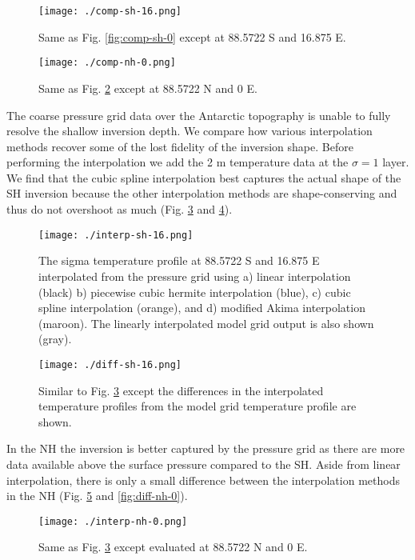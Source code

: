 \documentclass[11pt]{article}
\begin{document}
\begin{figure}[htbp]
\centering
\texttt{[image: ./comp-sh-16.png]}
\caption{\label{fig:comp-sh-16}Same as Fig. \ref{fig:comp-sh-0} except at 88.5722 S and 16.875 E.}
\end{figure}

\begin{figure}[htbp]
\centering
\texttt{[image: ./comp-nh-0.png]}
\caption{\label{fig:comp-nh-0}Same as Fig. \ref{fig:comp-nh-0} except at 88.5722 N and 0 E.}
\end{figure}

The coarse pressure grid data over the Antarctic topography is unable to fully resolve the shallow inversion depth. We compare how various interpolation methods recover some of the lost fidelity of the inversion shape. Before performing the interpolation we add the 2 m temperature data at the \(\sigma=1\) layer. We find that the cubic spline interpolation best captures the actual shape of the SH inversion because the other interpolation methods are shape-conserving and thus do not overshoot as much (Fig. \ref{fig:interp-sh-16} and \ref{fig:diff-sh-16}).

\begin{figure}[htbp]
\centering
\texttt{[image: ./interp-sh-16.png]}
\caption{\label{fig:interp-sh-16}The sigma temperature profile at 88.5722 S and 16.875 E interpolated from the pressure grid using a) linear interpolation (black) b) piecewise cubic hermite interpolation (blue), c) cubic spline interpolation (orange), and d) modified Akima interpolation (maroon). The linearly interpolated model grid output is also shown (gray).}
\end{figure}

\begin{figure}[htbp]
\centering
\texttt{[image: ./diff-sh-16.png]}
\caption{\label{fig:diff-sh-16}Similar to Fig. \ref{fig:interp-sh-16} except the differences in the interpolated temperature profiles from the model grid temperature profile are shown.}
\end{figure}

In the NH the inversion is better captured by the pressure grid as there are more data available above the surface pressure compared to the SH. Aside from linear interpolation, there is only a small difference between the interpolation methods in the NH (Fig. \ref{fig:interp-nh-0} and \ref{fig:diff-nh-0}).

\begin{figure}[htbp]
\centering
\texttt{[image: ./interp-nh-0.png]}
\caption{\label{fig:interp-nh-0}Same as Fig. \ref{fig:interp-sh-16} except evaluated at 88.5722 N and 0 E.}
\end{figure}
\end{document}
